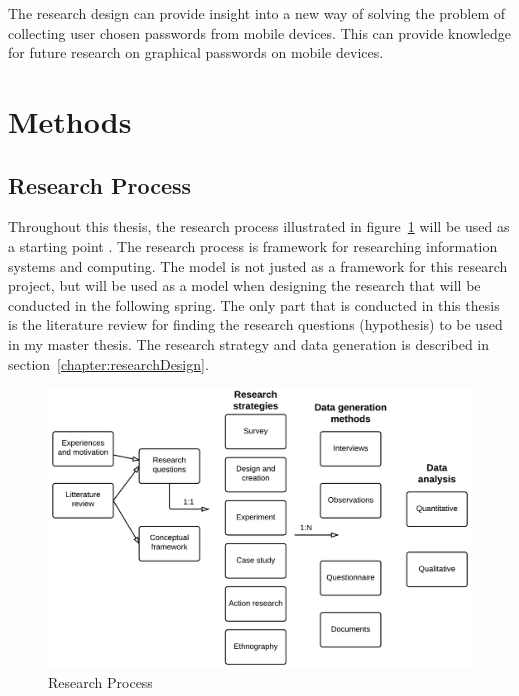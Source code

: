   The research design can provide insight into a new way of solving the problem of collecting user chosen passwords from mobile devices. This can provide knowledge for future research on graphical passwords on mobile devices.

  \section{Methods} \label{sec:method}

    \subsection{Research Process} \label{sec:methodresearchprocess}

    Throughout this thesis, the research process illustrated in figure~\ref{fig:researchProcess1} will be used as a starting point \cite{empiriske}. The research process is framework for researching information systems and computing. The model is not justed as a framework for this research project, but will be used as a model when designing the research that will be conducted in the following spring. The only part that is conducted in this thesis is the literature review for finding the research questions (hypothesis) to be used in my master thesis. The research strategy and data generation is described in section~\ref{chapter:researchDesign}.

      \begin{figure}[H]
        \centering
        \includegraphics[scale=0.18]{pics/ResearchProcess.png}
        \caption[Research process]{Research Process \cite{empiriske}}
        \label{fig:researchProcess1}
      \end{figure}

